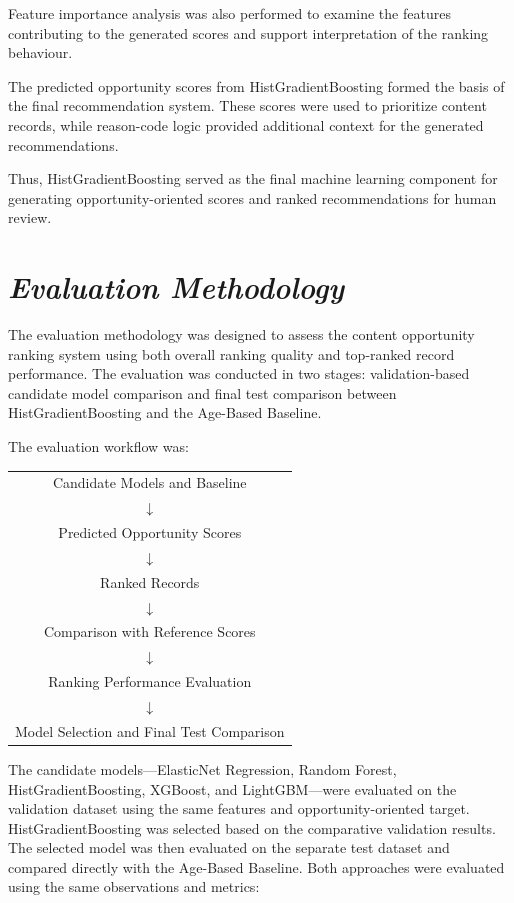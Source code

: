 \documentclass[12pt,a4paper]{report}
\begin{document}
Feature importance analysis was also performed to examine the features contributing to the generated scores and support interpretation of the ranking behaviour.

The predicted opportunity scores from HistGradientBoosting formed the basis of the final recommendation system. These scores were used to prioritize content records, while reason-code logic provided additional context for the generated recommendations.

Thus, HistGradientBoosting served as the final machine learning component for generating opportunity-oriented scores and ranked recommendations for human review.
 
\section{\textit{Evaluation Methodology}}
The evaluation methodology was designed to assess the content opportunity ranking system using both overall ranking quality and top-ranked record performance. The evaluation was conducted in two stages: validation-based candidate model comparison and final test comparison between HistGradientBoosting and the Age-Based Baseline.

The evaluation workflow was:

\begin{center}
\begin{tabular}{c}
Candidate Models and Baseline \\
$\downarrow$ \\
Predicted Opportunity Scores \\
$\downarrow$ \\
Ranked Records \\
$\downarrow$ \\
Comparison with Reference Scores \\
$\downarrow$ \\
Ranking Performance Evaluation \\
$\downarrow$ \\
Model Selection and Final Test Comparison
\end{tabular}
\end{center}

The candidate models---ElasticNet Regression, Random Forest, HistGradientBoosting, XGBoost, and LightGBM---were evaluated on the validation dataset using the same features and opportunity-oriented target. HistGradientBoosting was selected based on the comparative validation results. The selected model was then evaluated on the separate test dataset and compared directly with the Age-Based Baseline. Both approaches were evaluated using the same observations and metrics:
\end{document}
